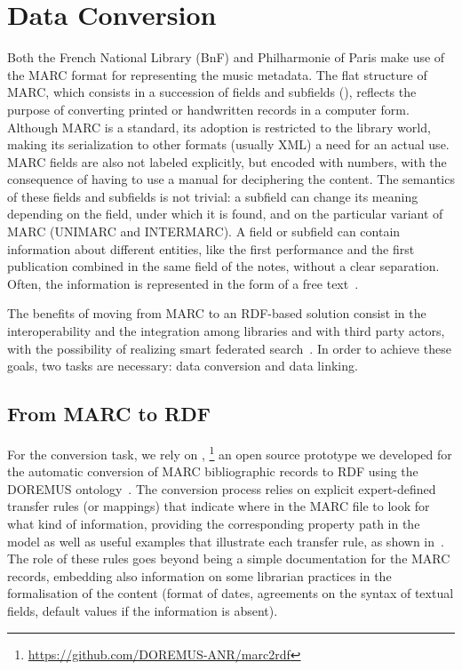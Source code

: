 \section{Data Conversion}\label{sec:convert}
Both the French National Library (BnF) and Philharmonie of Paris make use of the MARC format for representing the music metadata. The flat structure of MARC, which consists in a succession of fields and subfields (), reflects the purpose of converting printed or handwritten records in a computer form. Although MARC is a standard, its adoption is restricted to the library world, making its serialization to other formats (usually XML) a need for an actual use. MARC fields are also not labeled explicitly, but encoded with numbers, with the consequence of having to use a manual for deciphering the content. The semantics of these fields and subfields is not trivial: a subfield can change its meaning depending on the field, under which it is found, and on the particular variant of MARC (UNIMARC and INTERMARC). A field or subfield can contain information about different entities, like the first performance and the first publication combined in the same field of the notes, without a clear separation. Often, the information is represented in the form of a free text~\cite{tennant2002marc}.

The benefits of moving from MARC to an RDF-based solution consist in the interoperability and the integration among libraries and with third party actors, with the possibility of realizing smart federated search~\cite{byrne2010strongest, alemu2012linked}. In order to achieve these goals, two tasks are necessary: data conversion and data linking.

\subsection{From MARC to RDF}
For the conversion task, we rely on , \footnote{\url{https://github.com/DOREMUS-ANR/marc2rdf}} an open source prototype we developed for the automatic conversion of MARC bibliographic records to RDF using the DOREMUS ontology~\cite{lisena2016exploring}. The conversion process relies on explicit expert-defined transfer rules (or mappings) that indicate where in the MARC file to look for what kind of information, providing the corresponding property path in the model as well as useful examples that illustrate each transfer rule, as shown in~. The role of these rules goes beyond being a simple documentation for the MARC records, embedding also information on some librarian practices in the formalisation of the content (format of dates, agreements on the syntax of textual fields, default values if the information is absent).

